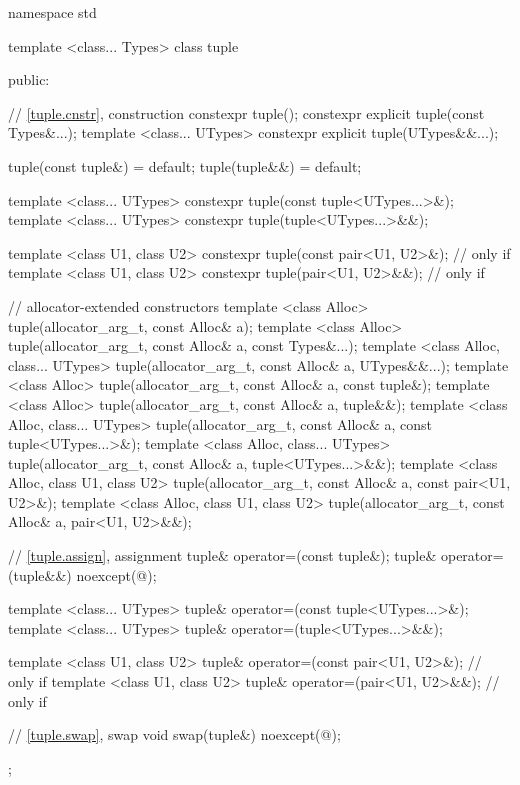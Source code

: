 %
\begin{codeblock}
namespace std {
  template <class... Types>
  class tuple  {
  public:

    // \ref{tuple.cnstr},  construction
    constexpr tuple();
    constexpr explicit tuple(const Types&...);
    template <class... UTypes>
      constexpr explicit tuple(UTypes&&...);

    tuple(const tuple&) = default;
    tuple(tuple&&) = default;

    template <class... UTypes>
      constexpr tuple(const tuple<UTypes...>&);
    template <class... UTypes>
      constexpr tuple(tuple<UTypes...>&&);

    template <class U1, class U2>
      constexpr tuple(const pair<U1, U2>&);       // only if 
    template <class U1, class U2>
      constexpr tuple(pair<U1, U2>&&);            // only if 

    // allocator-extended constructors
    template <class Alloc>
      tuple(allocator_arg_t, const Alloc& a);
    template <class Alloc>
      tuple(allocator_arg_t, const Alloc& a, const Types&...);
    template <class Alloc, class... UTypes>
      tuple(allocator_arg_t, const Alloc& a, UTypes&&...);
    template <class Alloc>
      tuple(allocator_arg_t, const Alloc& a, const tuple&);
    template <class Alloc>
      tuple(allocator_arg_t, const Alloc& a, tuple&&);
    template <class Alloc, class... UTypes>
      tuple(allocator_arg_t, const Alloc& a, const tuple<UTypes...>&);
    template <class Alloc, class... UTypes>
      tuple(allocator_arg_t, const Alloc& a, tuple<UTypes...>&&);
    template <class Alloc, class U1, class U2>
      tuple(allocator_arg_t, const Alloc& a, const pair<U1, U2>&);
    template <class Alloc, class U1, class U2>
      tuple(allocator_arg_t, const Alloc& a, pair<U1, U2>&&);

    // \ref{tuple.assign},  assignment
    tuple& operator=(const tuple&);
    tuple& operator=(tuple&&) noexcept(@\seebelow@);

    template <class... UTypes>
      tuple& operator=(const tuple<UTypes...>&);
    template <class... UTypes>
      tuple& operator=(tuple<UTypes...>&&);

    template <class U1, class U2>
      tuple& operator=(const pair<U1, U2>&);    // only if 
    template <class U1, class U2>
      tuple& operator=(pair<U1, U2>&&);         // only if 

    // \ref{tuple.swap},  swap
    void swap(tuple&) noexcept(@\seebelow@);
  };
}
\end{codeblock}

